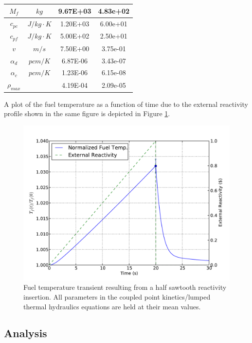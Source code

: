 \begin{table}
\begin{tabular}{||c|c|c|c||}
$M_f$        &  $kg$          &  9.67E+03  &  4.83e+02  \\ \hline
$c_{pc}$     &  $J/kg\cdot K$ &  1.20E+03  &  6.00e+01  \\ \hline
$c_{pf}$     &  $J/kg\cdot K$ &  5.00E+02  &  2.50e+01  \\ \hline
$v$          &  $m/s$         &  7.50E+00  &  3.75e-01  \\ \hline
$\alpha_d $  &  $pcm/K$       &  6.87E-06  &  3.43e-07  \\ \hline
$\alpha_c$   &  $pcm/K$       &  1.23E-06  &  6.15e-08  \\ \hline
$\rho_{max}$ &                &  4.19E-04  &  2.09e-05  \\ 
\hline \hline
\end{tabular}
\end{table}
A plot of the fuel temperature as a function of time due to the external reactivity profile shown in the same figure is depicted in Figure \ref{fig:pk_fuel_temp}. 
\begin{figure}[!htb]
\caption[Fuel temperature transient resulting from a half sawtooth reactivity insertion.]{ \label{fig:pk_fuel_temp}
Fuel temperature transient resulting from a half sawtooth reactivity insertion. All parameters in the coupled point kinetics/lumped thermal hydraulics equations are held at their mean values. 
}
 \begin{center}
  \includegraphics[scale=.75]{./Chapter3/pk_fueltemp.pdf}
 \end{center}
\end{figure}

\subsection{Analysis}
\label{subsec:pointkinetics_th_analysis}

